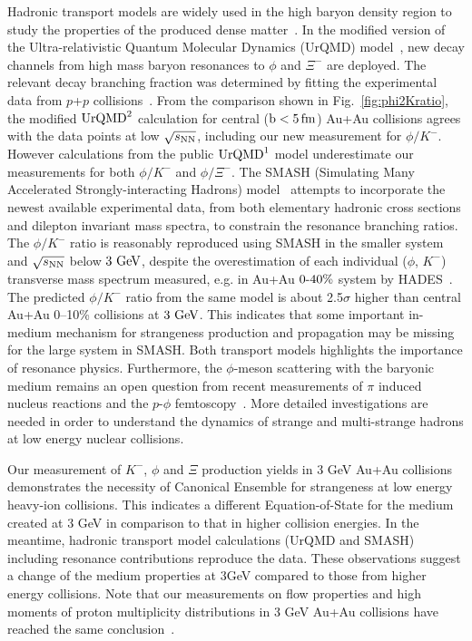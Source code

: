\documentclass[aps,tightenlines,superscriptaddress,twocolumn]{revtex4-1}
\begin{document}
Hadronic transport models are widely used in the high baryon density region to study the properties of the produced dense matter~\cite{UrQMD_2:1998,urQMD:1999,Hartnack:2011cn,Steinheimer_2015_UrQMD,Elfner_SMASH:2019,Song:2020clw}. In the modified version of the Ultra-relativistic Quantum Molecular Dynamics (UrQMD) model~\cite{Steinheimer_2015_UrQMD}, new decay channels from high mass baryon resonances to $\phi$ and $\Xi^-$ are deployed. The relevant decay branching fraction was determined by fitting the experimental data from $p$+$p$ collisions~\cite{ANKE_phi:2008}. From the comparison shown in Fig.~\ref{fig:phi2Kratio}, the modified $\textup{UrQMD}^{2}$ calculation for central ($\rm{b}<5\,\rm{fm}$) Au+Au collisions agrees with the data points at low ${\sqrt{s_{\rm NN}}}$, including our new measurement for $\phi/K^-$.
However calculations from the public $\textup{UrQMD}^{1}$ model underestimate our measurements for both $\phi/K^-$ and $\phi/\Xi^-$.   
The SMASH (Simulating Many Accelerated Strongly-interacting Hadrons) model~\cite{Elfner_SMASH:2019} attempts to incorporate the newest available experimental data, from both elementary hadronic cross sections and dilepton invariant mass spectra, to constrain the resonance branching ratios. The $\phi/K^-$ ratio is reasonably reproduced using SMASH in the smaller system and ${\sqrt{s_{\rm NN}}}$ below $\textup{3 GeV}$, despite the overestimation of each individual ($\phi$, $K^-$) transverse mass spectrum measured, e.g. in Au+Au $\textup{0-40\%}$ system by HADES~\cite{HADES_phi_AuAu:2018,Elfner_SMASH:2019}. The predicted $\phi/K^-$ ratio from the same model is about 2.5$\sigma$ higher than central Au+Au 0--10\% collisions at $\textup{3 GeV}$. This indicates that some important in-medium mechanism for strangeness production and propagation may be missing for the large system in SMASH. Both transport models highlights the importance of resonance physics. Furthermore, the $\phi$-meson scattering with the baryonic medium remains an open question from recent measurements of $\pi$ induced nucleus reactions and the $p$-$\phi$ femtoscopy~\cite{HADES_PRL_W_C:2019,ALICE_PRL_pp:2021}. More detailed investigations are needed in order to understand the dynamics of strange and multi-strange hadrons at low energy nuclear collisions.

Our measurement of $K^-$, $\phi$ and $\Xi$ production yields in 3 GeV Au+Au collisions demonstrates the necessity of Canonical Ensemble for strangeness at low energy heavy-ion collisions. This indicates a different Equation-of-State for the medium created at 3 GeV in comparison to that in higher collision energies. In the meantime,  hadronic transport model calculations (UrQMD and SMASH) including resonance contributions reproduce the data. These observations suggest a change of the medium properties at 3GeV compared to those from higher energy collisions. Note that our measurements on flow properties and high moments of proton multiplicity distributions in 3 GeV Au+Au collisions have reached the same conclusion~\cite{STAR:2021fge,STAR:2021yiu}.
\end{document}
